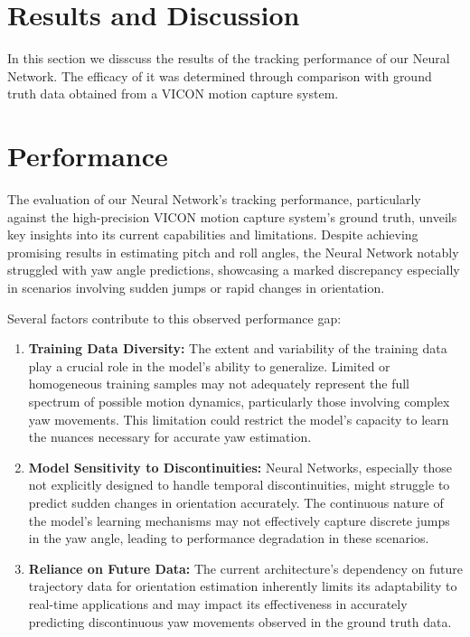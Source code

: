 \documentclass[conference]{IEEEtran}
\begin{document}
\section{Results and Discussion}

In this section we disscuss the results of the tracking performance of our Neural Network. The efficacy of it was determined through comparison with ground truth data obtained from a VICON motion capture system.

\section{Performance}

The evaluation of our Neural Network's tracking performance, particularly against the high-precision VICON motion capture system's ground truth, unveils key insights into its current capabilities and limitations. Despite achieving promising results in estimating pitch and roll angles, the Neural Network notably struggled with yaw angle predictions, showcasing a marked discrepancy especially in scenarios involving sudden jumps or rapid changes in orientation.

Several factors contribute to this observed performance gap:

\begin{enumerate}
\item \textbf{Training Data Diversity:} The extent and variability of the training data play a crucial role in the model's ability to generalize. Limited or homogeneous training samples may not adequately represent the full spectrum of possible motion dynamics, particularly those involving complex yaw movements. This limitation could restrict the model's capacity to learn the nuances necessary for accurate yaw estimation.
\item \textbf{Model Sensitivity to Discontinuities:} Neural Networks, especially those not explicitly designed to handle temporal discontinuities, might struggle to predict sudden changes in orientation accurately. The continuous nature of the model's learning mechanisms may not effectively capture discrete jumps in the yaw angle, leading to performance degradation in these scenarios.
\item \textbf{Reliance on Future Data:} The current architecture's dependency on future trajectory data for orientation estimation inherently limits its adaptability to real-time applications and may impact its effectiveness in accurately predicting discontinuous yaw movements observed in the ground truth data.
\end{enumerate}
\end{document}
